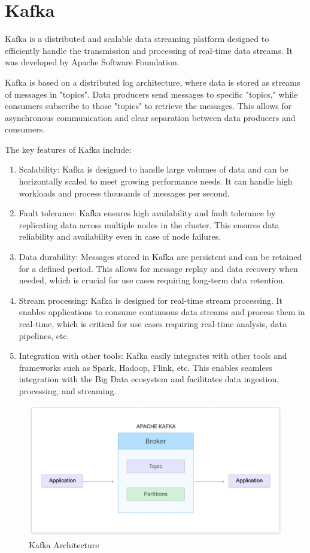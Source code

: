 \section{Kafka}

Kafka is a distributed and scalable data streaming platform designed to efficiently handle the transmission and processing of real-time data streams. It was developed by Apache Software Foundation.

Kafka is based on a distributed log architecture, where data is stored as streams of messages in "topics". Data producers send messages to specific "topics," while consumers subscribe to those "topics" to retrieve the messages. This allows for asynchronous communication and clear separation between data producers and consumers.

\cite{kafka}

The key features of Kafka include:

\begin{enumerate}
\item Scalability: Kafka is designed to handle large volumes of data and can be horizontally scaled to meet growing performance needs. It can handle high workloads and process thousands of messages per second.
\item Fault tolerance: Kafka ensures high availability and fault tolerance by replicating data across multiple nodes in the cluster. This ensures data reliability and availability even in case of node failures.
\item Data durability: Messages stored in Kafka are persistent and can be retained for a defined period. This allows for message replay and data recovery when needed, which is crucial for use cases requiring long-term data retention.
\item Stream processing: Kafka is designed for real-time stream processing. It enables applications to consume continuous data streams and process them in real-time, which is critical for use cases requiring real-time analysis, data pipelines, etc.
\item Integration with other tools: Kafka easily integrates with other tools and frameworks such as Spark, Hadoop, Flink, etc. This enables seamless integration with the Big Data ecosystem and facilitates data ingestion, processing, and streaming.
\end{enumerate}

\begin{figure}[H]
\centering
\includegraphics[width=\linewidth]{images/kafka.jpg}
\caption{Kafka Architecture}\label{fig:kafka}
\end{figure}


